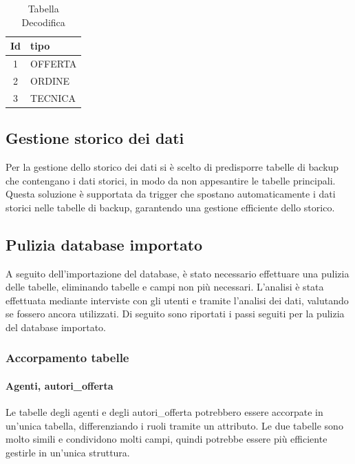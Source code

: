 \documentclass[12pt, a4paper]{article}
\begin{document}
\vspace{1cm} %

\begin{table}[h!]
    \centering

    \begin{tabular}{|c|l|}
        \hline
        \textbf{Id} & \textbf{tipo} \\ \hline
        1           & OFFERTA       \\ \hline
        2           & ORDINE        \\ \hline
        3           & TECNICA       \\ \hline
    \end{tabular}
    \vspace{0.5cm}
    \caption{Tabella Decodifica}
\end{table}
\subsection{Gestione storico dei dati}
Per la gestione dello storico dei dati si è scelto di predisporre tabelle di backup che contengano i dati storici, in modo da non appesantire le tabelle principali.
Questa soluzione è supportata da trigger che spostano automaticamente i dati storici nelle tabelle di backup, garantendo una gestione efficiente dello storico.
\subsection{Pulizia database importato}
A seguito dell'importazione del database, è stato necessario effettuare una pulizia delle tabelle, eliminando tabelle e campi non più necessari.
L'analisi è stata effettuata mediante interviste con gli utenti e tramite l'analisi dei dati, valutando se fossero ancora utilizzati.
Di seguito sono riportati i passi seguiti per la pulizia del database importato.


\subsubsection{Accorpamento tabelle}

\paragraph{Agenti, autori\_offerta}
Le tabelle degli agenti e degli autori\_offerta potrebbero essere accorpate in un'unica tabella, differenziando i ruoli tramite un attributo.
Le due tabelle sono molto simili e condividono molti campi, quindi potrebbe essere più efficiente gestirle in un'unica struttura.
\end{document}
